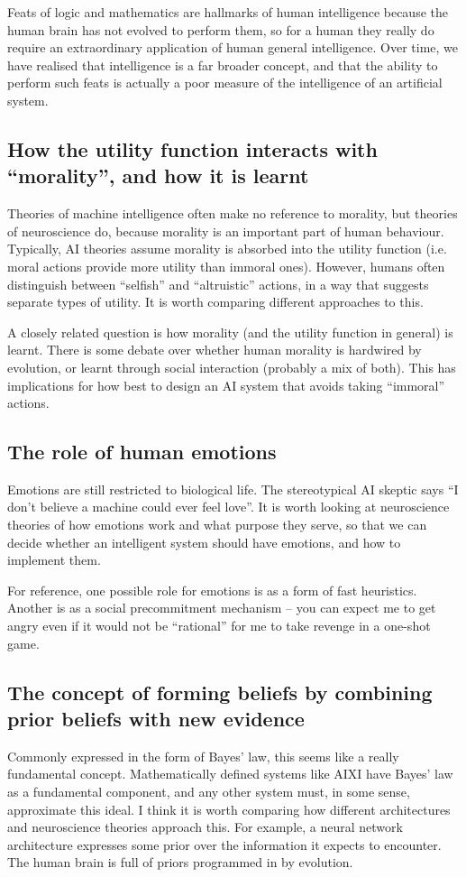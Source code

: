 \documentclass[10pt,a4paper]{article}
\newcommand{\nquote}[1]{``{#1}''}
\begin{document}
Feats of logic and mathematics are hallmarks of human intelligence because the human brain has not evolved to perform them, so for a human they really do require an extraordinary application of human general intelligence. Over time, we have realised that intelligence is a far broader concept, and that the ability to perform such feats is actually a poor measure of the intelligence of an artificial system.

\subsection{How the utility function interacts with \nquote{morality}, and how it is learnt}
Theories of machine intelligence often make no reference to morality, but theories of neuroscience do, because morality is an important part of human behaviour. Typically, AI theories assume morality is absorbed into the utility function (i.e. moral actions provide more utility than immoral ones). However, humans often distinguish between \nquote{selfish} and \nquote{altruistic} actions, in a way that suggests separate types of utility. It is worth comparing different approaches to this.

A closely related question is how morality (and the utility function in general) is learnt. There is some debate over whether human morality is hardwired by evolution, or learnt through social interaction (probably a mix of both). This has implications for how best to design an AI system that avoids taking \nquote{immoral} actions.

\subsection{The role of human emotions}
Emotions are still restricted to biological life. The stereotypical AI skeptic says \nquote{I don't believe a machine could ever feel love}. It is worth looking at neuroscience theories of how emotions work and what purpose they serve, so that we can decide whether an intelligent system should have emotions, and how to implement them.

For reference, one possible role for emotions is as a form of fast heuristics. Another is as a social precommitment mechanism -- you can expect me to get angry even if it would not be \nquote{rational} for me to take revenge in a one-shot game.

\subsection{The concept of forming beliefs by combining prior beliefs with new evidence}
Commonly expressed in the form of Bayes' law, this seems like a really fundamental concept. Mathematically defined systems like AIXI have Bayes' law as a fundamental component, and any other system must, in some sense, approximate this ideal. I think it is worth comparing how different architectures and neuroscience theories approach this. For example, a neural network architecture expresses some prior over the information it expects to encounter. The human brain is full of priors programmed in by evolution.
\end{document}
